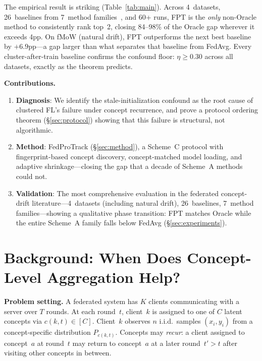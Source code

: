 \documentclass[11pt]{article}
\begin{document}
The empirical result is striking (Table~\ref{tab:main}).
Across 4~datasets, 26~baselines from 7~method families~\citep{kairouz2021advances, gama2014survey, lu2018learning}, and 60+ runs, FPT is the \emph{only} non-Oracle method to consistently rank top~2, closing 84--98\% of the Oracle gap wherever it exceeds 4pp.
On fMoW (natural drift), FPT outperforms the next best baseline by $+6.9$pp---a gap larger than what separates that baseline from FedAvg.
Every cluster-after-train baseline confirms the confound floor: $\eta \ge 0.30$ across all datasets, exactly as the theorem predicts.

\textbf{Contributions.}
\begin{enumerate}[leftmargin=*,topsep=2pt,itemsep=1pt]
    \item \textbf{Diagnosis}: We identify the stale-initialization confound as the root cause of clustered FL's failure under concept recurrence, and prove a protocol ordering theorem (\S\ref{sec:protocol}) showing that this failure is structural, not algorithmic.

    \item \textbf{Method}: FedProTrack (\S\ref{sec:method}), a Scheme~C protocol with fingerprint-based concept discovery, concept-matched model loading, and adaptive shrinkage---closing the gap that a decade of Scheme~A methods could not.

    \item \textbf{Validation}: The most comprehensive evaluation in the federated concept-drift literature---4~datasets (including natural drift), 26~baselines, 7~method families---showing a qualitative phase transition: FPT matches Oracle while the entire Scheme~A family falls below FedAvg (\S\ref{sec:experiments}).
\end{enumerate}


\section{Background: When Does Concept-Level Aggregation Help?}
\label{sec:background}

\textbf{Problem setting.}
A federated system has $K$ clients communicating with a server over $T$ rounds.
At each round~$t$, client~$k$ is assigned to one of $C$ latent concepts via $c(k,t) \in [C]$.
Client~$k$ observes $n$ i.i.d.\ samples $(x_i, y_i)$ from a concept-specific distribution $P_{c(k,t)}$.
Concepts may \emph{recur}: a client assigned to concept~$a$ at round~$t$ may return to concept~$a$ at a later round~$t' > t$ after visiting other concepts in between.
\end{document}
